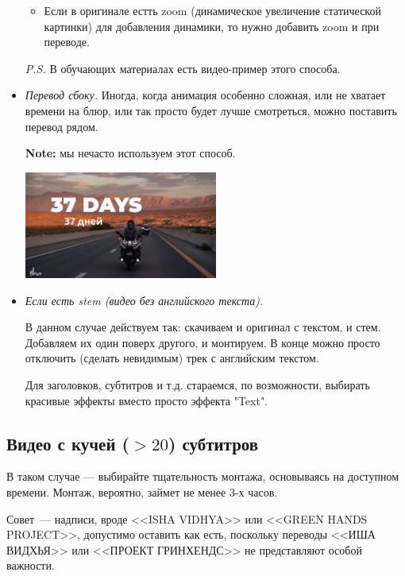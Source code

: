 \documentclass[
a4paper, %
12pt, %
article,
onecolumn, %
openany, %
]{memoir}
\begin{document}
\begin{itemize}
\begin{itemize}
            \item Если в оригинале естть zoom (динамическое увеличение
                статической картинки) для добавления динамики, то нужно
                добавить zoom и при переводе.

        \end{itemize}
        \textit{P.S.} В обучающих материалах есть видео-пример этого способа.

    \item \emph{Перевод сбоку.}
        Иногда, когда анимация особенно сложная, или не хватает времени на блюр,
        или так просто будет лучше смотреться, можно поставить перевод рядом.

        \textbf{Note:} мы нечасто используем этот способ.

        \begin{center}
            \includegraphics[width=0.5\textwidth]{textBelowExample}
        \end{center}

    \item \emph{Если есть stem (видео без английского текста).}

        В данном случае действуем так: скачиваем и оригинал с текстом,
        и стем. Добавляем их один поверх другого, и монтируем. В конце
        можно просто отключить (сделать невидимым) трек
        с английским текстом.

        Для заголовков, субтитров и т.д. стараемся, по возможности,
        выбирать красивые эффекты вместо просто эффекта "Text".
\end{itemize}


\subsection{Видео с кучей ($> 20$) субтитров}
В таком случае --- выбирайте тщательность монтажа, основываясь на доступном времени.
Монтаж, вероятно, займет 
не менее 3-х часов. 

Совет~--- надписи, вроде <<ISHA VIDHYA>> или <<GREEN HANDS PROJECT>>, допустимо 
оставить как есть, поскольку переводы <<ИША ВИДХЬЯ>> или <<ПРОЕКТ ГРИНХЕНДС>>
не представляют особой важности.
\end{document}
